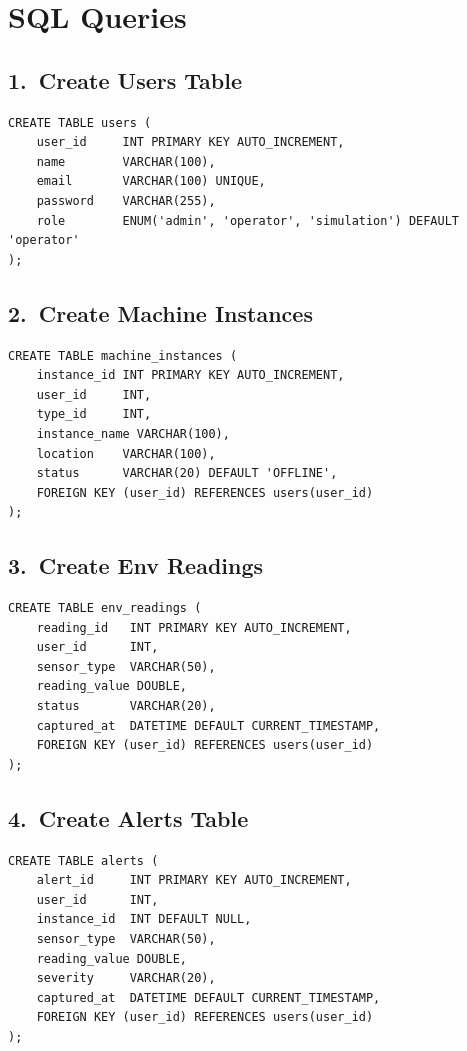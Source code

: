 \documentclass[12pt, a4paper]{article}
\begin{document}
\section{SQL Queries}

\subsection{1.\ Create Users Table}
\begin{lstlisting}
CREATE TABLE users (
    user_id     INT PRIMARY KEY AUTO_INCREMENT,
    name        VARCHAR(100),
    email       VARCHAR(100) UNIQUE,
    password    VARCHAR(255),
    role        ENUM('admin', 'operator', 'simulation') DEFAULT 'operator'
);
\end{lstlisting}

\subsection{2.\ Create Machine Instances}
\begin{lstlisting}
CREATE TABLE machine_instances (
    instance_id INT PRIMARY KEY AUTO_INCREMENT,
    user_id     INT,
    type_id     INT,
    instance_name VARCHAR(100),
    location    VARCHAR(100),
    status      VARCHAR(20) DEFAULT 'OFFLINE',
    FOREIGN KEY (user_id) REFERENCES users(user_id)
);
\end{lstlisting}

\subsection{3.\ Create Env Readings}
\begin{lstlisting}
CREATE TABLE env_readings (
    reading_id   INT PRIMARY KEY AUTO_INCREMENT,
    user_id      INT,
    sensor_type  VARCHAR(50),
    reading_value DOUBLE,
    status       VARCHAR(20),
    captured_at  DATETIME DEFAULT CURRENT_TIMESTAMP,
    FOREIGN KEY (user_id) REFERENCES users(user_id)
);
\end{lstlisting}

\subsection{4.\ Create Alerts Table}
\begin{lstlisting}
CREATE TABLE alerts (
    alert_id     INT PRIMARY KEY AUTO_INCREMENT,
    user_id      INT,
    instance_id  INT DEFAULT NULL,
    sensor_type  VARCHAR(50),
    reading_value DOUBLE,
    severity     VARCHAR(20),
    captured_at  DATETIME DEFAULT CURRENT_TIMESTAMP,
    FOREIGN KEY (user_id) REFERENCES users(user_id)
);
\end{lstlisting}
\end{document}
